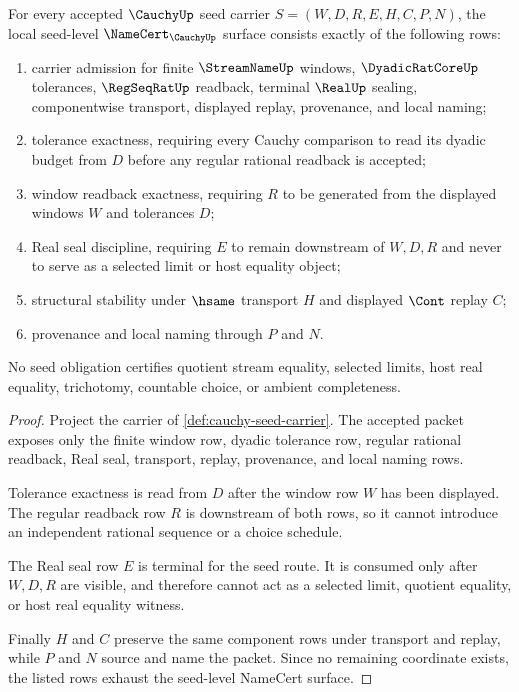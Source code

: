 \begin{theorem}\label{thm:cauchy-seed-namecert-obligations}
For every accepted $\CauchyUp$ seed carrier $S=(W,D,R,E,H,C,P,N)$, the local seed-level $\NameCert_{\CauchyUp}$ surface consists exactly of the following rows:
\begin{enumerate}
\item carrier admission for finite $\StreamNameUp$ windows, $\DyadicRatCoreUp$ tolerances, $\RegSeqRatUp$ readback, terminal $\RealUp$ sealing, componentwise transport, displayed replay, provenance, and local naming;
\item tolerance exactness, requiring every Cauchy comparison to read its dyadic budget from $D$ before any regular rational readback is accepted;
\item window readback exactness, requiring $R$ to be generated from the displayed windows $W$ and tolerances $D$;
\item Real seal discipline, requiring $E$ to remain downstream of $W,D,R$ and never to serve as a selected limit or host equality object;
\item structural stability under $\hsame$ transport $H$ and displayed $\Cont$ replay $C$;
\item provenance and local naming through $P$ and $N$.
\end{enumerate}
No seed obligation certifies quotient stream equality, selected limits, host real equality, trichotomy, countable choice, or ambient completeness.
\end{theorem}
\begin{proof}
Project the carrier of \autoref{def:cauchy-seed-carrier}. The accepted packet exposes only the finite window row, dyadic tolerance row, regular rational readback, Real seal, transport, replay, provenance, and local naming rows.

Tolerance exactness is read from $D$ after the window row $W$ has been displayed. The regular readback row $R$ is downstream of both rows, so it cannot introduce an independent rational sequence or a choice schedule.

The Real seal row $E$ is terminal for the seed route. It is consumed only after $W,D,R$ are visible, and therefore cannot act as a selected limit, quotient equality, or host real equality witness.

Finally $H$ and $C$ preserve the same component rows under transport and replay, while $P$ and $N$ source and name the packet. Since no remaining coordinate exists, the listed rows exhaust the seed-level NameCert surface.
\end{proof}

